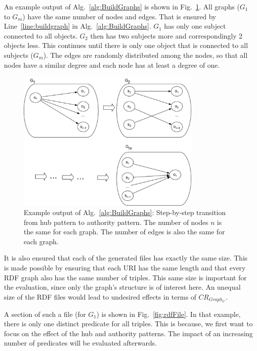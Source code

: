 An example output of Alg.~\ref{alg:BuildGraphs} is shown in Fig.~\ref{fig:star_pattern}. All graphs ($G_1$ to $G_m$) have the same number of nodes and edges. That is ensured by Line~\ref{line:buildgraph} in Alg.~\ref{alg:BuildGraphs}. $G_1$ has only one subject connected to all objects. $G_2$ then has two subjects more and correspondingly 2 objects less. This continues until there is only one object that is connected to all subjects ($G_m$). The edges are randomly distributed among the nodes, so that all nodes have a similar degree and each node has at least a degree of one.

\begin{figure}[h]
	\centering
	\includegraphics[width=0.8\textwidth]{figures/GRPvsHDT/starpattern.pdf}
	\caption{Example output of Alg.~\ref{alg:BuildGraphs}: Step-by-step transition from hub pattern to authority pattern. The number of nodes $n$ is the same for each graph. The number of edges is also the same for each graph.}
	\label{fig:star_pattern}
\end{figure}

It is also ensured that each of the generated files has exactly the same size. This is made possible by ensuring that each URI has the same length and that every RDF graph also has the same number of triples. This same size is important for the evaluation, since only the graph's structure is of interest here. An unequal size of the RDF files would lead to undesired effects in terms of $CR_{Graph_C}$.

A section of such a file (for $G_1$) is shown in Fig.~\ref{fig:rdfFile}. In that example, there is only one distinct predicate for all triples. This is because, we first want to focus on the effect of the hub and authority patterns. The impact of an increasing number of predicates will be evaluated afterwards.


